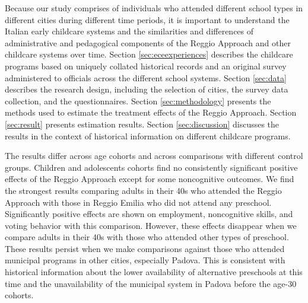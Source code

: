 Because our study comprises of individuals who attended different school types in different cities during different time periods, it is important to understand the Italian early childcare systems and the similarities and differences of administrative and pedagogical components of the Reggio Approach and other childcare systems over time. Section \ref{sec:eceexperiences} describes the childcare programs based on uniquely collated historical records and an original survey administered to officials across the different school systems. Section \ref{sec:data} describes the research design, including the selection of cities, the survey data collection, and the questionnaires. Section \ref{sec:methodology} presents the methods used to estimate the treatment effects of the Reggio Approach. Section \ref{sec:result} presents estimation results. Section \ref{sec:discussion} discusses the results in the context of historical information on different childcare programs. 

The results differ across age cohorts and across comparisons with different control groups. Children and adolescents cohorts find no consistently significant positive effects of the Reggio Approach except for some noncognitive outcomes. We find the strongest results comparing adults in their 40s who attended the Reggio Approach with those in Reggio Emilia who did not attend any preschool. Significantly positive effects are shown on employment, noncognitive skills, and voting behavior with this comparison. However, these effects disappear when we compare adults in their 40s with those who attended other types of preschool. These results persist when we make comparisons against those who attended municipal programs in other cities, especially Padova. This is consistent with historical information about the lower availability of alternative preschools at this time and the unavailability of the municipal system in Padova before the age-30 cohorts.
